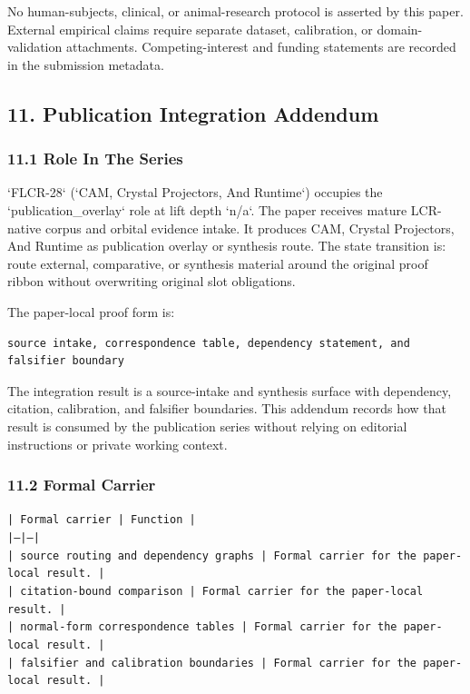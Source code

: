 \documentclass[11pt]{article}
\begin{document}
No human-subjects, clinical, or animal-research protocol is asserted by this
paper. External empirical claims require separate dataset, calibration, or
domain-validation attachments. Competing-interest and funding statements are recorded in the submission metadata.

\subsection*{11. Publication Integration Addendum}

\subsubsection*{11.1 Role In The Series}

`FLCR-28` (`CAM, Crystal Projectors, And Runtime`) occupies the `publication\_overlay` role at lift depth `n/a`.
The paper receives mature LCR-native corpus and orbital evidence intake. It produces CAM, Crystal Projectors, And Runtime as publication overlay or synthesis route. The state transition is:
route external, comparative, or synthesis material around the original proof ribbon without overwriting original slot obligations.

The paper-local proof form is:

\begin{verbatim}
source intake, correspondence table, dependency statement, and falsifier boundary
\end{verbatim}

The integration result is a source-intake and synthesis surface with dependency, citation, calibration, and falsifier boundaries. This addendum records how that result is
consumed by the publication series without relying on editorial instructions or
private working context.

\subsubsection*{11.2 Formal Carrier}

\noindent\texttt{| Formal carrier | Function |}\\
\noindent\texttt{|---|---|}\\
\noindent\texttt{| source routing and dependency graphs | Formal carrier for the paper-local result. |}\\
\noindent\texttt{| citation-bound comparison | Formal carrier for the paper-local result. |}\\
\noindent\texttt{| normal-form correspondence tables | Formal carrier for the paper-local result. |}\\
\noindent\texttt{| falsifier and calibration boundaries | Formal carrier for the paper-local result. |}\\
\end{document}
